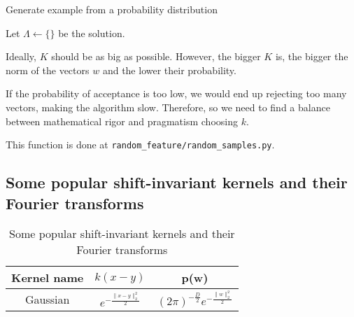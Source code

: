 \begin{algorithm}[hbt!]
    \caption{Generate example from a probability distribution }\label{alg:two}
  
        Let $\Lambda \gets \{\}$ be the solution. 
        \\
        \Return{$\Lambda$} 
    \end{algorithm}

Ideally, $K$ should be as big as  possible. 
However, the bigger $K$ is, the bigger the norm of the vectors $w$
and the lower their probability. 

If the probability of acceptance is too low, we would end up rejecting too many vectors, making the algorithm slow. Therefore, so we need to find a balance 
between mathematical rigor and pragmatism choosing $k$. 

This function is done at \texttt{random\_feature/random\_samples.py}. 


\subsection{Some popular shift-invariant kernels and their Fourier transforms}

\begin{table}[h!]
    \centering
    \begin{tabular}{|c|c|c|}
    \hline
     Kernel name & $k(x-y)$ & p(w) \\
     \hline
     Gaussian 
     & $e^{- \frac{\| x- y\|^2_2}{2}}$
    & 
    $(2 \pi)^{-\frac{D}{2}} e^{- \frac{\| w\|^2_2}{2}}$ 
    \\
    \hline
    \end{tabular}
    \caption{Some popular shift-invariant kernels and their Fourier transforms}
\end{table}


